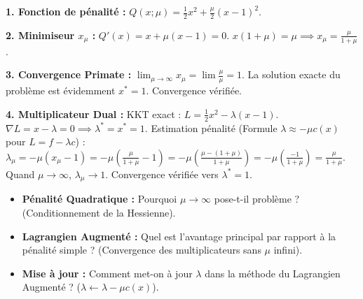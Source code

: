 \begin{correction}
\textbf{1. Fonction de pénalité :}
$Q(x; \mu) = \frac{1}{2}x^2 + \frac{\mu}{2}(x-1)^2$.

\textbf{2. Minimiseur $x_\mu$ :}
$Q'(x) = x + \mu(x-1) = 0$.
$x(1+\mu) = \mu \implies x_\mu = \frac{\mu}{1+\mu}$.

\textbf{3. Convergence Primate :}
$\lim_{\mu \to \infty} x_\mu = \lim \frac{\mu}{\mu} = 1$.
La solution exacte du problème est évidemment $x^*=1$. Convergence vérifiée.

\textbf{4. Multiplicateur Dual :}
KKT exact : $L = \frac{1}{2}x^2 - \lambda(x-1)$. $\nabla L = x - \lambda = 0 \implies \lambda^* = x^* = 1$.
Estimation pénalité (Formule $\lambda \approx -\mu c(x)$ pour $L = f - \lambda c$) :
$\lambda_\mu = -\mu (x_\mu - 1) = -\mu (\frac{\mu}{1+\mu} - 1) = -\mu (\frac{\mu - (1+\mu)}{1+\mu}) = -\mu (\frac{-1}{1+\mu}) = \frac{\mu}{1+\mu}$.
Quand $\mu \to \infty$, $\lambda_\mu \to 1$.
Convergence vérifiée vers $\lambda^* = 1$.
\end{correction}
\bigskip

\bigskip
\begin{checkpoint}
\begin{itemize}
    \item \textbf{Pénalité Quadratique :} Pourquoi $\mu \to \infty$ pose-t-il problème ? (Conditionnement de la Hessienne).
    \item \textbf{Lagrangien Augmenté :} Quel est l'avantage principal par rapport à la pénalité simple ? (Convergence des multiplicateurs sans $\mu$ infini).
    \item \textbf{Mise à jour :} Comment met-on à jour $\lambda$ dans la méthode du Lagrangien Augmenté ? ($\lambda \leftarrow \lambda - \mu c(x)$).
\end{itemize}
\end{checkpoint}

